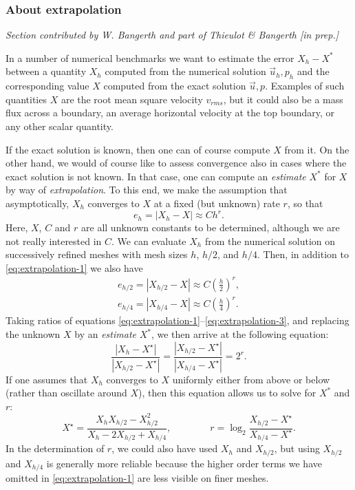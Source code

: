  
\subsubsection{About extrapolation}

{\it Section contributed by W. Bangerth and part of Thieulot \& Bangerth [in prep.]}

In a number of numerical benchmarks we
want to estimate the error $X_h-X^\ast$ between a quantity $X_h$ computed
from the numerical solution $\vec{u}_h,p_h$ and the corresponding value
$X$ computed from the exact solution $\vec{u},p$. Examples of such quantities
$X$ are the root mean square velocity $v_{rms}$, but it could also be a mass flux
across a boundary, an average horizontal velocity at the top boundary, or
any other scalar quantity.

If the exact solution is known, then one can of course compute $X$ from it.
On the other hand, we would of course like to assess convergence also in
cases where the exact solution is not known. In that case, one can compute
an \textit{estimate} $X^\ast$ for $X$ by way of \textit{extrapolation}.
To this end, we make the assumption that asymptotically, $X_h$ converges to
$X$ at a fixed (but unknown) rate $r$, so that
\begin{equation}
  \label{eq:extrapolation-1}
  e_h=|X_h-X| \approx C h^r.
\end{equation}
Here, $X$, $C$ and $r$ are all unknown constants to be determined, although
we are not really interested in $C$.
We can evaluate $X_h$ from the numerical solution
on successively refined meshes with mesh sizes $h$, $h/2$, and $h/4$. Then,
in addition to \eqref{eq:extrapolation-1} we also have
\begin{eqnarray}
  \label{eq:extrapolation-2}
  e_{h/2}=|X_{h/2}-X| \approx C \left(\frac h2\right)^r,
  \\
  \label{eq:extrapolation-3}
  e_{h/4} =|X_{h/4}-X| \approx C \left(\frac h4\right)^r.
\end{eqnarray}
Taking ratios of equations \eqref{eq:extrapolation-1}--\eqref{eq:extrapolation-3},
and replacing the unknown $X$ by an \textit{estimate} $X^\ast$, we then
arrive at the following equation:
\begin{equation*}
\frac{|X_h-X^\star|}{|X_{h/2}-X^\star|}
=
\frac{|X_{h/2}-X^\star|}{|X_{h/4}-X^\star|}=2^r.
\end{equation*}
If one assumes that $X_h$ converges to $X$ uniformly either from above or
below (rather than oscillate around $X$), then this equation allows us
to solve for $X^\ast$ and $r$:
\begin{equation*}
X^\star = \frac{X_h X_{h/2}-X_{h/2}^2}{X_h - 2 X_{h/2} + X_{h/4}}, \qquad\qquad
r = \log_2 \frac{X_{h/2}-X^\star}{X_{h/4}-X^\star}.
\end{equation*}
In the determination of $r$, we could also have used $X_h$ and $X_{h/2}$,
but using $X_{h/2}$ and $X_{h/4}$ is generally more reliable because
the higher order terms we have omitted in \eqref{eq:extrapolation-1} are less
visible on finer meshes.

